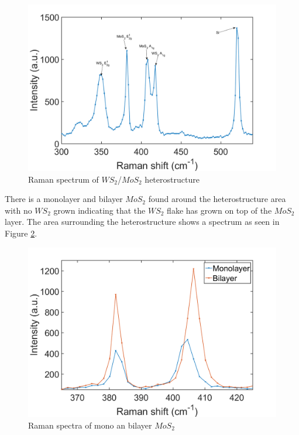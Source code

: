 \begin{figure}[h]
	\begin{center}
		\includegraphics[scale=0.3]{Heterostructures/RamanSpectrum2.png}
		\caption{Raman spectrum of $WS_2$/$MoS_2$ heterostructure}
		\label{fig:HeterostructureRamanSpectrum}
	\end{center}
\end{figure}

There is a monolayer and bilayer $MoS_2$ found around the heterostructure area with no $WS_2$ grown  indicating that the $WS_2$ flake has grown on top of the $MoS_2$ layer. The area surrounding the heterostructure shows a spectrum as seen in Figure \ref{fig:HeterostructuresRamanSpectraMonoBi}. 
\newpage

\begin{figure}[h]
	\begin{center}
		\includegraphics[scale=0.3]{Heterostructures/RamanSpectraMonoBi2.png}
		\caption{Raman spectra of mono an bilayer $MoS_2$}
		\label{fig:HeterostructuresRamanSpectraMonoBi}
	\end{center}
\end{figure}

